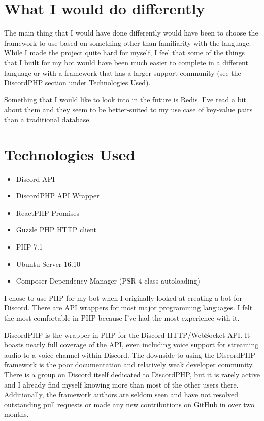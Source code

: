\documentclass[12pt]{article} %
\begin{document}
\section{What I would do differently}

The main thing that I would have done differently would have been to choose the framework to use based on something other than familiarity with the language. While I made the project quite hard for myself, I feel that some of the things that I built for my bot would have been much easier to complete in a different language or with a framework that has a larger support community (see the DiscordPHP section under Technologies Used).

Something that I would like to look into in the future is Redis. I've read a bit about them and they seem to be better-suited to my use case of key-value pairs than a traditional database.


\section{Technologies Used}

\begin{itemize}
    \item Discord API
    \item DiscordPHP API Wrapper
    \item ReactPHP Promises
    \item Guzzle PHP HTTP client
    \item PHP 7.1
    \item Ubuntu Server 16.10
    \item Composer Dependency Manager (PSR-4 class autoloading)
\end{itemize}

I chose to use PHP for my bot when I originally looked at creating a bot for Discord. There are API wrappers for most major programming languages. I felt the most comfortable in PHP because I've had the most experience with it.

DiscordPHP is the wrapper in PHP for the Discord HTTP/WebSocket API. It boasts nearly full coverage of the API, even including voice support for streaming audio to a voice channel within Discord. The downside to using the DiscordPHP framework is the poor documentation and relatively weak developer community. There is a group on Discord itself dedicated to DiscordPHP, but it is rarely active and I already find myself knowing more than most of the other users there. Additionally, the framework authors are seldom seen and have not resolved outstanding pull requests or made any new contributions on GitHub in over two months.
\end{document}
